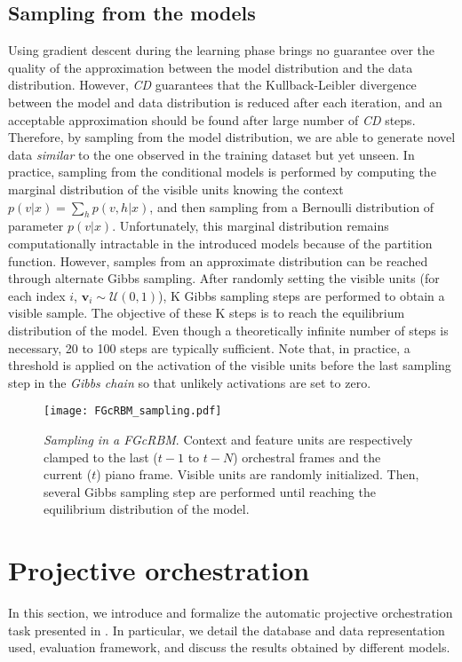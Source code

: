 \documentclass{amsart}
\begin{document}
	\subsection{Sampling from the models}
	Using gradient descent during the learning phase brings no guarantee over the quality of the approximation between the model distribution and the data distribution.
	However, \textit{CD} guarantees that the Kullback-Leibler divergence between the model and data distribution is reduced after each iteration\cite{hinton2002training}, and an acceptable approximation should be found after large number of \textit{CD} steps.
	Therefore, by sampling from the model distribution, we are able to generate novel data \textit{similar} to the one observed in the training dataset but yet unseen. In practice, sampling from the conditional models is performed by computing the marginal distribution of the visible units knowing the context $p(v|x) = \sum_{h} p(v,h|x)$, and then sampling from a Bernoulli distribution of parameter $p(v|x)$.
	Unfortunately, this marginal distribution remains computationally intractable in the introduced models because of the partition function. However, samples from an approximate distribution can be reached through alternate Gibbs sampling. After randomly setting the visible units (for each index $i$, $\bm{v}_{i} \sim \mathcal{U}(0,1)$), K Gibbs sampling steps are performed to obtain a visible sample. The objective of these K steps is to reach the equilibrium distribution of the model. Even though a theoretically  infinite number of steps is necessary, 20 to 100 steps are typically sufficient.
	Note that, in practice, a threshold is applied on the activation of the visible units before the last sampling step in the \textit{Gibbs chain} so that unlikely activations are set to zero.
	
	\begin{figure}
		\centering
		\texttt{[image: FGcRBM\_sampling.pdf]}
		\caption{\textit{Sampling in a FGcRBM}. Context and feature units are respectively clamped to the last ($t-1$ to $t-N$) orchestral frames and the current ($t$) piano frame. Visible units are randomly initialized. Then, several Gibbs sampling step are performed until reaching the equilibrium distribution of the model.}
		\label{fig:FGcRBM_sampling}
	\end{figure}
	
	\section{Projective orchestration}
	In this section, we introduce and formalize the automatic projective orchestration task presented in . In particular, we detail the database and data representation used, evaluation framework, and discuss the results obtained by different models.
	
\end{document}
